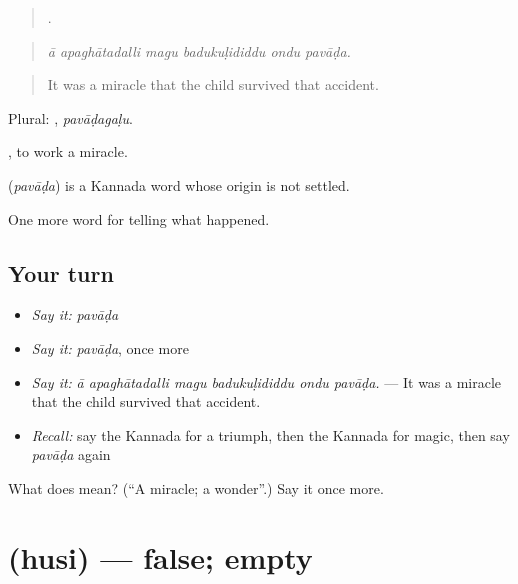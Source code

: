 \begin{quote}
     .
\end{quote}

\begin{quote}
\emph{ā apaghātadalli magu badukuḷididdu ondu pavāḍa.}
\end{quote}

\begin{quote}
It was a miracle that the child survived that accident.
\end{quote}

Plural: , \emph{pavāḍagaḷu}.

 , to work a miracle.

\begin{cousinweb}
\textbf{} (\emph{pavāḍa}) is a Kannada word whose origin is not settled.
\end{cousinweb}

\begin{grammarlens}[title={What you've built}]
One more word for telling what happened.
\end{grammarlens}

\subsection*{Your turn}
\begin{itemize}
\raggedright
  \item \emph{Say it:} \emph{pavāḍa}
  \item \emph{Say it:} \emph{pavāḍa}, once more
  \item \emph{Say it:} \emph{ā apaghātadalli magu badukuḷididdu ondu pavāḍa.} — It was a miracle that the child survived that accident.
  \item \emph{Recall:} say the Kannada for a triumph, then the Kannada for magic, then say \emph{pavāḍa} again
\end{itemize}

\begin{tcolorbox}[breakable,colback=teal!4,colframe=teal!35!black,title={Before you move on}]
What does  mean? (\textquotedblleft{}A miracle; a wonder\textquotedblright{}.) Say it once more.
\end{tcolorbox}
\section[\texorpdfstring{\kn{ಹುಸಿ} (husi)}{ಹುಸಿ (husi)}]{ (husi) — false; empty}

